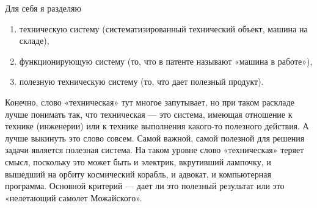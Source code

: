 \documentclass[11pt,a4paper]{article}
\begin{document}
Для себя я разделяю 
\begin{enumerate}
\item техническую систему (систематизированный технический объект, машина на
  складе),
\item функционирующую систему (то, что в патенте называют «машина в работе»),
\item полезную техническую систему (то, что дает полезный продукт).
\end{enumerate}

Конечно, слово «техническая» тут многое запутывает, но при таком раскладе
лучше понимать так, что техническая — это система, имеющая отношение к технике
(инженерии) или к технике выполнения какого-то полезного действия. А лучше
выкинуть это слово совсем.  Самой важной, самой полезной для решения задачи
является полезная система. На таком уровне слово «техническая» теряет смысл,
поскольку это может быть и электрик, вкрутивший лампочку, и вышедший на орбиту
космический корабль, и адвокат, и компьютерная программа. Основной критерий —
дает ли это полезный результат или это «нелетающий самолет Можайского».
\end{document}

